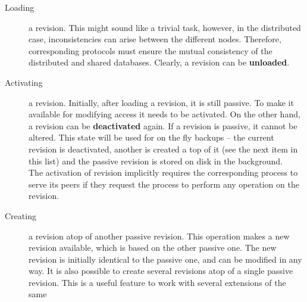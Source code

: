 \documentclass[a4paper, 10pt]{book}
\begin{document}
                                \begin{description}
                                    \item[Loading] a revision. This might sound like a trivial task,
                                        however, in the distributed case,  inconsistencies can arise between
                                        the different nodes. Therefore, corresponding protocols must ensure
                                        the mutual consistency of the distributed and shared databases.
                                        Clearly, a revision can be \textbf{unloaded}.
                                    \item[Activating] a revision. Initially, after loading a revision, it
                                        is still passive. To make it available for modifying access it needs
                                        to be activated.
                                        On the other hand, a revision can be \textbf{deactivated} again.
                                        If a revision is passive, it cannot be altered. This state will be
                                        used for on the fly backups -- the current revision is deactivated,
                                        another is created a top of it (see the next item in this list) and
                                        the passive revision is stored on disk in the background.\\
                                        The activation of revision implicitly requires the corresponding
                                        process to serve its peers if they request the process to perform
                                        any operation on the revision.
                                    \item[Creating] a revision atop of another passive revision. This
                                        operation makes a new revision available, which is based on the
                                        other passive one. The new revision is initially identical to the
                                        passive one, and can be modified in any way. It is also possible to
                                        create several revisions atop of a single passive revision. This is
                                        a useful feature to work with several extensions of the same

\end{description}
\end{document}
